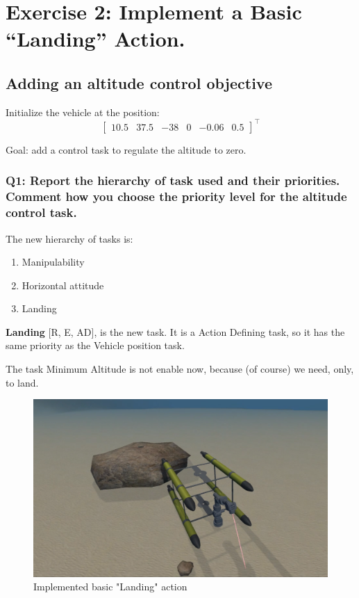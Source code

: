 \documentclass{article}
\begin{document}
\clearpage

\section{Exercise 2: Implement a Basic “Landing” Action.}
\subsection{Adding an altitude control objective}
Initialize the vehicle at the position:
\begin{displaymath}
\begin{bmatrix} 10.5 & 37.5 & -38 & 0 & -0.06 & 0.5 \end{bmatrix}^\top
\end{displaymath} 

Goal: add a control task to regulate the altitude to zero.

\subsubsection{Q1: Report the hierarchy of task used and their priorities. Comment how you choose the priority level for the altitude control task.}
The new hierarchy of tasks is:
\begin{enumerate}
	\item Manipulability
	\item Horizontal attitude
	\item Landing
\end{enumerate}
\begin{description}
\item \textbf{Landing} [R, E, AD], is the new task. It is a Action Defining task, so it has the same priority as the Vehicle position task.
\end{description}
The task Minimum Altitude is not enable now, because (of course) we need, only, to land.

\begin{figure}[h]
    \centering
    \includegraphics[scale=0.4]{211_Landing.png}
    \caption{Implemented basic "Landing" action}
    \label{images_2_3_1}
\end{figure}
\end{document}
